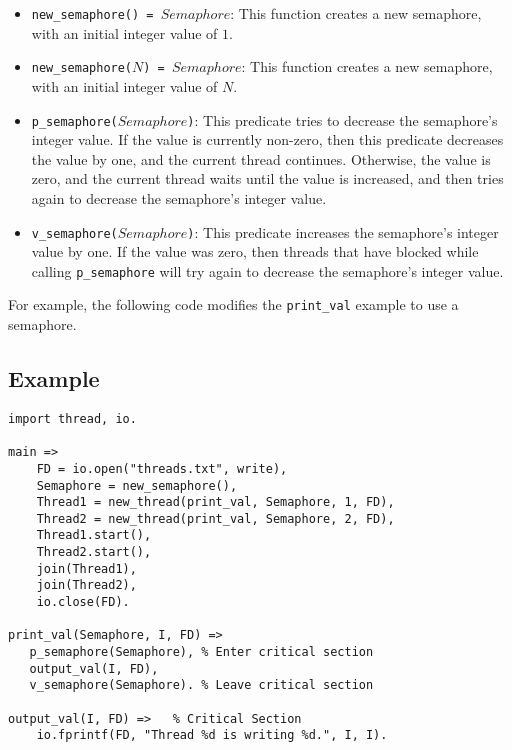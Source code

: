 \begin{itemize}
\item \texttt{new\_semaphore() = $Semaphore$}: This function creates a new semaphore, with an initial integer value of $1$.
\item \texttt{new\_semaphore($N$) = $Semaphore$}: This function creates a new semaphore, with an initial integer value of $N$.
\item \texttt{p\_semaphore($Semaphore$)}: This predicate tries to decrease the semaphore's integer value.  If the value is currently non-zero, then this predicate decreases the value by one, and the current thread continues.  Otherwise, the value is zero, and the current thread waits until the value is increased, and then tries again to decrease the semaphore's integer value.
\item \texttt{v\_semaphore($Semaphore$)}: This predicate increases the semaphore's integer value by one.  If the value was zero, then threads that have blocked while calling \texttt{p\_semaphore} will try again to decrease the semaphore's integer value.
\end{itemize}

For example, the following code modifies the \texttt{print\_val} example to use a semaphore.

\subsection*{Example}
\begin{verbatim}
import thread, io.

main =>
    FD = io.open("threads.txt", write),
    Semaphore = new_semaphore(),
    Thread1 = new_thread(print_val, Semaphore, 1, FD),
    Thread2 = new_thread(print_val, Semaphore, 2, FD),
    Thread1.start(),
    Thread2.start(),
    join(Thread1),
    join(Thread2),
    io.close(FD).

print_val(Semaphore, I, FD) =>
   p_semaphore(Semaphore), % Enter critical section
   output_val(I, FD),
   v_semaphore(Semaphore). % Leave critical section

output_val(I, FD) =>   % Critical Section
    io.fprintf(FD, "Thread %d is writing %d.", I, I).
\end{verbatim}

